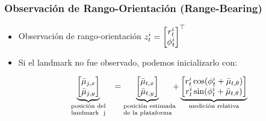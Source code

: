 \begin{frame}
    \frametitle{Observación de Rango-Orientación (Range-Bearing)}

    \begin{itemize}
        \item Observación de rango-orientación $z_t^i = \begin{bmatrix} r_t^i \\ \phi_t^i \end{bmatrix}^{\top}$
        
        \item Si el landmark no fue observado, podemos inicializarlo con:
    \end{itemize}
    
    \begin{equation*}
        \underbrace{
        \begin{bmatrix}
        \bar{\mu}_{j,x} \\
        \bar{\mu}_{j,y}
        \end{bmatrix}}_{\parbox{2cm}{\centering \scriptsize \text{posición del} \\ \text{landmark } j}}
        =
        \underbrace{
        \begin{bmatrix}
        \bar{\mu}_{t,x} \\
        \bar{\mu}_{t,y}
        \end{bmatrix}}_{\parbox{2cm}{\centering \scriptsize \text{posición estimada} \\ \text{de la plataforma}}}
        +
        \underbrace{
        \begin{bmatrix}
        r_t^i \cos(\phi_t^i + \bar{\mu}_{t,\theta}) \\
        r_t^i \sin(\phi_t^i + \bar{\mu}_{t,\theta})
        \end{bmatrix}}_{\text{medición relativa}}
    \end{equation*}
\end{frame}

